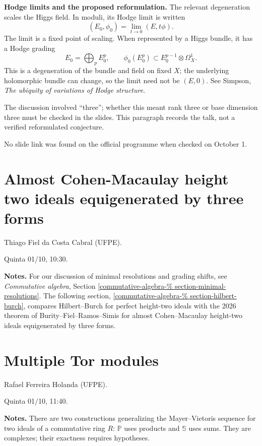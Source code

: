 \medskip\noindent
\textbf{Hodge limits and the proposed
reformulation.}
The relevant degeneration scales the
Higgs field. In moduli, its Hodge limit
is written
$$
(E_0,\phi_0)=\lim_{t\to0}(E,t\phi).
$$
The limit is a fixed point of scaling.
When represented by a Higgs bundle, it
has a Hodge grading
$$
E_0=\bigoplus_p E_0^p,
\qquad
\phi_0(E_0^p)\subset
E_0^{p-1}\otimes\Omega_X^1.
$$
This is a degeneration of the bundle
and field on fixed $X$; the underlying
holomorphic bundle can change, so the
limit need not be $(E,0)$.
See Simpson, \emph{The ubiquity of
variations of Hodge structure}.

The discussion involved ``three'';
whether this meant rank three or base
dimension three must be checked in the
slides. This paragraph records the talk,
not a verified reformulated conjecture.

No slide link was found on the official
programme when checked on October 1.

\section{Almost Cohen-Macaulay height two
ideals
equigenerated by three forms}
\label{section-thiago-cabral}

Thiago Fiel da Costa Cabral (UFPE).

Quinta 01/10, 10:30.

\medskip\noindent
\textbf{Notes.}
For our discussion of minimal resolutions
and grading shifts, see
\emph{Commutative algebra}, Section
\ref{commutative-algebra-%
section-minimal-resolutions}.
The following section,
\ref{commutative-algebra-%
section-hilbert-burch}, compares
Hilbert--Burch for perfect height-two ideals
with the 2026 theorem of
Burity--Fiel--Ramos--Simis for
almost Cohen--Macaulay height-two ideals
equigenerated by three forms.

\section{Multiple Tor modules}
\label{section-rafael-holanda}

Rafael Ferreira Holanda (UFPE).

Quinta 01/10, 11:40.

\medskip\noindent
\textbf{Notes.}
There are two constructions generalizing
the Mayer--Vietoris sequence for two
ideals of a commutative ring $R$:
$\mathbb{P}$ uses products and
$\mathbb{S}$ uses sums.
They are complexes; their exactness
requires hypotheses.


